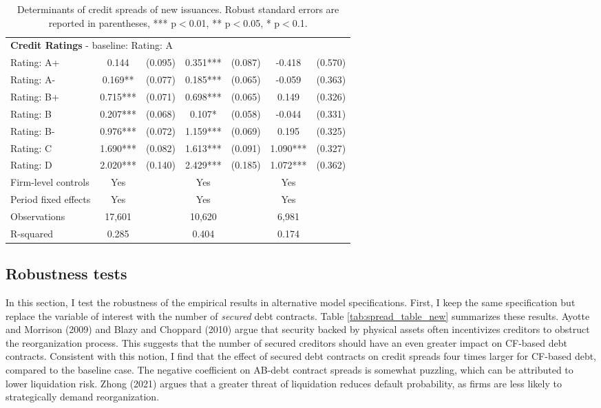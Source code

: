 \documentclass[12pt]{article}
\begin{document}
\begin{table}[H]
{\begin{tabular}{lcccccc}
    \multicolumn{7}{l}{\textbf{Credit Ratings} - baseline: Rating: A} \\
    Rating: A+ & 0.144 & (0.095) & 0.351*** & (0.087) & -0.418 & (0.570) \\
    Rating: A- &  0.169** & (0.077) & 0.185*** & (0.065) & -0.059 & (0.363) \\
    Rating: B+ & 0.715*** & (0.071) & 0.698*** & (0.065) & 0.149 & (0.326) \\
    Rating: B & 0.207*** & (0.068) & 0.107* & (0.058) & -0.044 & (0.331) \\
    Rating: B- & 0.976*** & (0.072) & 1.159*** & (0.069) & 0.195 & (0.325) \\
    Rating: C  & 1.690*** & (0.082) & 1.613*** & (0.091) & 1.090*** & (0.327) \\
    Rating: D & 2.020*** & (0.140) & 2.429*** & (0.185) & 1.072*** & (0.362) \\
    \midrule
    Firm-level controls & Yes & & Yes & & Yes & \\
    Period fixed effects & Yes & & Yes & & Yes & \\
    Observations & 17,601 & & 10,620 & & 6,981 & \\
    R-squared & 0.285 & & 0.404 & & 0.174 & \\
    \bottomrule
    \end{tabular}%
    }
    \caption{\small Determinants of credit spreads of new issuances. Robust standard errors are reported in parentheses,  *** p$<$0.01, ** p$<$0.05, * p$<$0.1.}
\end{table}





\subsection{Robustness tests \label{sec:robustness}}

In this section, I test the robustness of the empirical results in alternative model specifications. First, I keep the same specification but replace the variable of interest with the number of \textit{secured} debt contracts. Table \ref{tab:spread_table_new} summarizes these results. Ayotte and Morrison (2009) and Blazy and Choppard (2010) argue that security backed by physical assets often incentivizes creditors to obstruct the reorganization process. This suggests that the number of secured creditors should have an even greater impact on CF-based debt contracts. Consistent with this notion, I find that the effect of secured debt contracts on credit spreads four times larger for CF-based debt, compared to the baseline case. The negative coefficient on AB-debt contract spreads is somewhat puzzling, which can be attributed to lower liquidation risk. Zhong (2021) argues that a greater threat of liquidation reduces default probability, as firms are less likely to strategically demand reorganization.
\end{document}
